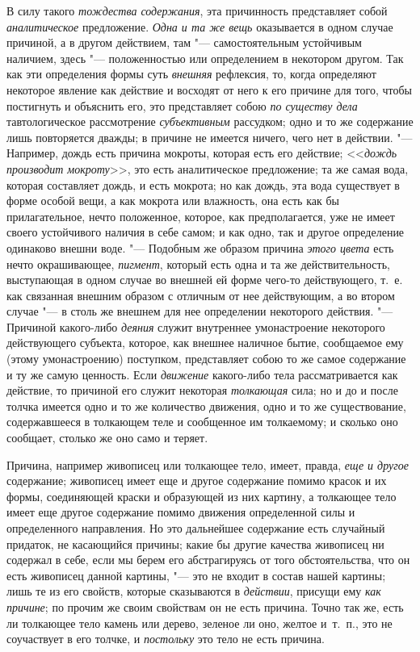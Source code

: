 В силу такого {\em тождества содержания}, эта
причинность представляет собой {\em аналитическое}
предложение. {\em Одна и та же вещь} оказывается в
одном случае причиной, а в другом действием, там "--- самостоятельным
устойчивым наличием, здесь "--- положенностью или определением в некотором
другом. Так как эти определения формы суть
{\em внешняя} рефлексия, то, когда определяют некоторое
явление как действие и восходят от него к его причине для того, чтобы
постигнуть и объяснить его, это представляет собою
{\em по существу дела} тавтологическое рассмотрение
{\em субъективным} рассудком; одно и то же содержание
лишь повторяется дважды; в причине не имеется ничего, чего нет в действии.
"--- Например, дождь есть причина мокроты, которая есть его действие;
<<{\em дождь производит мокроту}>>, это есть
аналитическое предложение; та же самая вода, которая составляет дождь, и
есть мокрота; но как дождь, эта вода существует в форме особой вещи, а как
мокрота или влажность, она есть как бы прилагательное, нечто положенное,
которое, как предполагается, уже не имеет своего устойчивого наличия в себе
самом; и как одно, так и другое определение одинаково внешни воде. "---
Подобным же образом причина {\em этого цвета} есть
нечто окрашивающее, {\em пигмент}, который есть одна и
та же действительность, выступающая в одном случае во внешней ей форме
чего-то действующего, т.~е. как связанная внешним образом с отличным от нее
действующим, а во втором случае "--- в столь же внешнем для нее определении
некоторого действия. "--- Причиной какого-либо
{\em деяния} служит внутреннее умонастроение некоторого
действующего субъекта, которое, как внешнее наличное бытие, сообщаемое ему
(этому умонастроению) поступком, представляет собою то же самое содержание
и ту же самую ценность. Если {\em движение} какого-либо
тела рассматривается как действие, то причиной его служит некоторая
{\em толкающая} сила; но и до и после толчка имеется
одно и то же количество движения, одно и то же существование, содержавшееся
в толкающем теле и сообщенное им толкаемому; и сколько оно сообщает,
столько же оно само и теряет.

Причина, например живописец или толкающее тело, имеет, правда,
{\em еще и другое} содержание; живописец имеет еще и
другое содержание помимо красок и их формы, соединяющей краски и образующей
из них картину, а толкающее тело имеет еще другое содержание помимо
движения определенной силы и определенного направления. Но это дальнейшее
содержание есть случайный придаток, не касающийся причины; какие бы другие
качества живописец ни содержал в себе, если мы берем его абстрагируясь от
того обстоятельства, что он есть живописец данной картины, "--- это не входит
в состав нашей картины; лишь те из его свойств, которые сказываются в
{\em действии}, присущи ему
{\em как причине}; по прочим же своим свойствам он не
есть причина. Точно так же, есть ли толкающее тело камень или дерево,
зеленое ли оно, желтое и~т.~п., это не соучаствует в его толчке, и
{\em постольку} это тело не есть причина.

